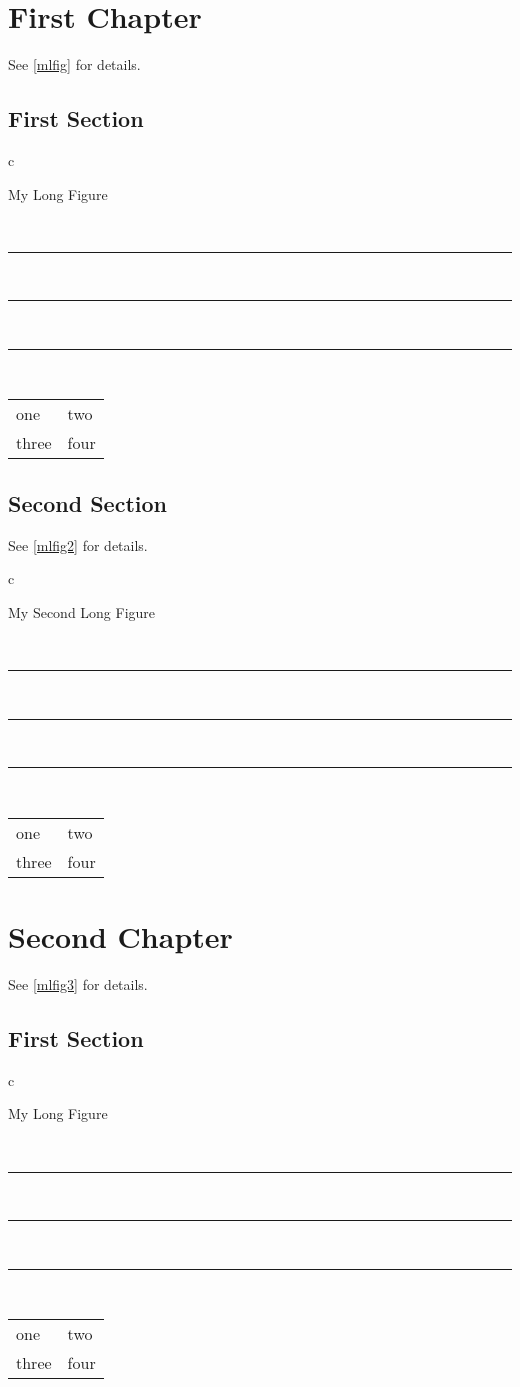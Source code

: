 \documentclass{book}
\begin{document}
\listofdisplay
\chapter{First Chapter}
See \ref{mlfig} for details.

\section{First Section}
\begin{longfigure}{c}
\caption{My Long Figure}\label{mlfig}\\
\rule{3in}{1in}\\
\rule{3in}{1in}\\
\pagebreak
\rule{3in}{1in}\\

\begin{tabular}{ll}
one & two \\
three & four\\
\end{tabular}
\end{longfigure}


\section{Second Section}

See \ref{mlfig2} for details.
\begin{longfigure}{c}
\caption{My Second Long Figure}\label{mlfig2}\\
\rule{3in}{1in}\\
\rule{3in}{1in}\\
\rule{3in}{1in}\\
\begin{tabular}{ll}
one & two \\
three & four\\
\end{tabular}
\end{longfigure}


\chapter{Second Chapter}
See \ref{mlfig3} for details.

\section{First Section}
\begin{longfigure}{c}
\caption{My Long Figure}\label{mlfig3}\\
\rule{3in}{1in}\\
\rule{3in}{1in}\\
\pagebreak
\rule{3in}{1in}\\

\begin{tabular}{ll}
one & two \\
three & four\\
\end{tabular}
\end{longfigure}
\end{document}
